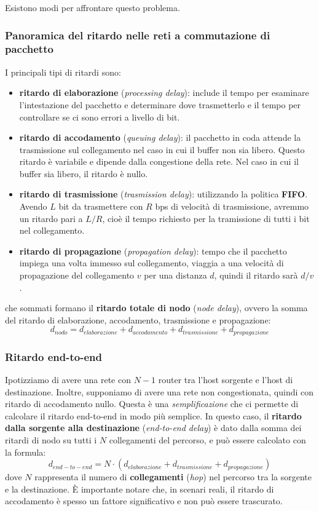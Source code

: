 Esistono modi per affrontare questo problema. 

\subsubsection{Panoramica del ritardo nelle reti a commutazione di pacchetto}
I principali tipi di ritardi sono:
\begin{itemize}
  \item \textbf{ritardo di elaborazione} (\textit{processing delay}): include il tempo per esaminare l'intestazione del pacchetto e determinare dove trasmetterlo e il tempo per controllare se ci sono errori a livello di bit.  
  \item \textbf{ritardo di accodamento} (\textit{queuing delay}): il pacchetto in coda attende la trasmissione sul collegamento nel caso in cui il buffer non sia libero. Questo ritardo è variabile e dipende dalla congestione della rete. Nel caso in cui il buffer sia libero, il ritardo è nullo.
  \item \textbf{ritardo di trasmissione} (\textit{trasmission delay}): utilizzando la politica \textbf{FIFO}. Avendo $L$ bit da trasmettere con $R$ bps di velocità di trasmissione, avremmo un ritardo pari a $L/R$, cioè il tempo richiesto per la tramissione di tutti i bit nel collegamento. 
  \item \textbf{ritardo di propagazione} (\textit{propagation delay}): tempo che il pacchetto impiega una volta immesso sul collegamento, viaggia a una velocità di propagazione del collegamento $v$ per una distanza $d$, quindi il ritardo sarà $d/v$.  
\end{itemize}
che sommati formano il \textbf{ritardo totale di nodo} (\textit{node delay}), ovvero la somma del ritardo di elaborazione, accodamento, trasmissione e propagazione:
\[
  d_{nodo} = d_{elaborazione} + d_{accodamento} + d_{trasmissione} + d_{propagazione} 
\]

\subsubsection{Ritardo end-to-end}
Ipotizziamo di avere una rete con $N - 1$ router tra l'host sorgente e l'host di destinazione. Inoltre, supponiamo di avere una rete non congestionata, quindi con ritardo di accodamento nullo. Questa è una \textit{semplificazione} che ci permette di calcolare il ritardo end-to-end in modo più semplice. In questo caso, il \textbf{ritardo dalla sorgente alla destinazione} (\textit{end-to-end delay}) è dato dalla somma dei ritardi di nodo su tutti i $N$ collegamenti del percorso, e può essere calcolato con la formula:
\[
  d_{end-to-end} = N \cdot (d_{elaborazione} + d_{trasmissione} + d_{propagazione})
\]
dove $N$ rappresenta il numero di \textbf{collegamenti} (\textit{hop}) nel percorso tra la sorgente e la destinazione. È importante notare che, in scenari reali, il ritardo di accodamento è spesso un fattore significativo e non può essere trascurato.

